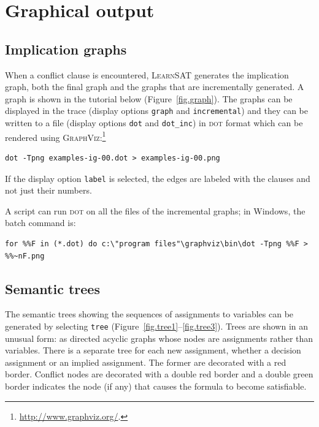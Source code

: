\documentclass[11pt]{report}
\newcommand*{\p}[1]{\textup{\texttt{#1}}}
\newcommand*{\ls}{\textsc{LearnSAT}}
\newcommand*{\dt}{\textsc{dot}}
\begin{document}
\clearpage

\section{Graphical output}

\subsection{Implication graphs}\label{s.impl}

When a conflict clause is encountered, \ls{} generates the implication
graph, both the final graph and the graphs that are incrementally
generated. A graph is shown in the tutorial below
(Figure~\ref{fig.graph}). The graphs can be displayed in the trace
(display options \p{graph} and \p{incremental}) and they can be written
to a file (display options \p{dot} and \p{dot\_inc}) in \dt{} format
which can be rendered using
\textsc{GraphViz}:\footnote{\url{http://www.graphviz.org/}.}

\begin{verbatim}
dot -Tpng examples-ig-00.dot > examples-ig-00.png
\end{verbatim}

If the display option \p{label} is selected, the edges are labeled with
the clauses and not just their numbers.

A script can run \dt{} on all the files of the incremental graphs; in
Windows, the batch command is:

\begin{verbatim}
for %%F in (*.dot) do c:\"program files"\graphviz\bin\dot -Tpng %%F > %%~nF.png
\end{verbatim}


\subsection{Semantic trees}

The semantic trees showing the sequences of assignments to variables can
be generated by selecting \p{tree}
(Figure~\ref{fig.tree1}--\ref{fig.tree3}). Trees are shown in an unusual
form: as directed acyclic graphs whose nodes are assignments rather than
variables. There is a separate tree for each new assignment, whether a
decision assignment or an implied assignment. The former are decorated
with a red border. Conflict nodes are decorated with a double red border
and a double green border indicates the node (if any) that causes the
formula to become satisfiable.
\end{document}
